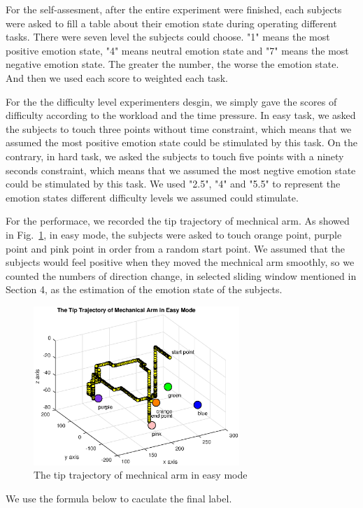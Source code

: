 \documentclass[runningheads,a4paper]{llncs}
\begin{document}
For the self-assesment, after the entire experiment were finished,
each subjects were asked to fill a table about their emotion state during
operating different tasks. There were seven level the subjects could choose.
"1" means the most positive emotion state, "4" means neutral emotion state and
"7" means the most negative emotion state. The greater the number, the worse the
emotion state. And then we used each score to weighted each task.

For the the difficulty level experimenters desgin, we simply gave the scores of
difficulty according to the workload and the time pressure. In easy task, we
asked the subjects to touch three points without time constraint, which means that
we assumed the most positive emotion state could be stimulated by this task.
On the contrary, in hard task, we asked the subjects to touch five points with a ninety seconds
constraint, which means that we assumed the most negtive emotion state could be stimulated by
this task. We used "2.5", "4" and "5.5" to represent the emotion states different difficulty levels
we assumed could stimulate.

For the performace, we recorded the tip trajectory of mechnical arm. As showed
in Fig.~\ref{fig:track}, in easy mode, the subjects were asked to touch orange
point, purple point and pink point in order from a random start point. We assumed
that the subjects would feel positive when they moved the mechnical arm smoothly,
so we counted the numbers of direction change, in selected sliding window
mentioned in Section 4, as the estimation of the emotion state of the subjects.

\begin{figure}
  \centering
  \includegraphics[height=6cm]{images/14}
  \caption{The tip trajectory of mechnical arm in easy mode}
  \label{fig:track}
\end{figure}

We use the formula below to caculate the final label.
\end{document}
